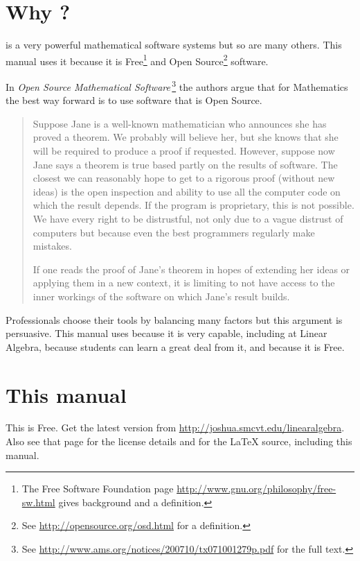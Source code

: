 \section{Why \Sage?}
\Sage{} is a very powerful mathematical software systems but so are
many others.
This manual uses it because it is 
Free\footnote{The Free Software Foundation page 
\protect\url{http://www.gnu.org/philosophy/free-sw.html} 
gives background and a definition.} 
and Open Source\footnote{See \protect\url{http://opensource.org/osd.html} 
for a definition.} 
software.

In 
\textit{Open Source Mathematical Software\,}\citep{JoynerStein07}\footnote{See 
\protect\url{http://www.ams.org/notices/200710/tx071001279p.pdf} for the 
full text.}
the authors argue that for Mathematics the best way forward
is to use software that is Open Source.

\begin{quotation}\small
Suppose Jane is a well-known mathematician who announces
she has proved a theorem. We probably will believe
her, but she knows that she will be required to produce
a proof if requested. However, suppose now Jane says a
theorem is true based partly on the results of software. The
closest we can reasonably hope to get to a rigorous proof
(without new ideas) is the open inspection and ability to use
all the computer code on which the result depends. If the
program is proprietary, this is not possible. We have every
right to be distrustful, not only due to a vague distrust of
computers but because even the best programmers regularly
make mistakes.

If one reads the proof of Jane’s theorem in hopes of
extending her ideas or applying them in a new context, it
is limiting to not have access to the inner workings of the
software on which Jane’s result builds.
\end{quotation}  
Professionals choose their tools by balancing many factors but
this argument is persuasive.
This manual uses \Sage{} because it is very capable, 
including at Linear Algebra, because students can 
learn a great deal from it,
and because it is Free.


\section{This manual}
This is Free.
Get the latest version from 
\url{http://joshua.smcvt.edu/linearalgebra}.
Also see that page for the license details and for 
the \LaTeX{} source, including this manual.

